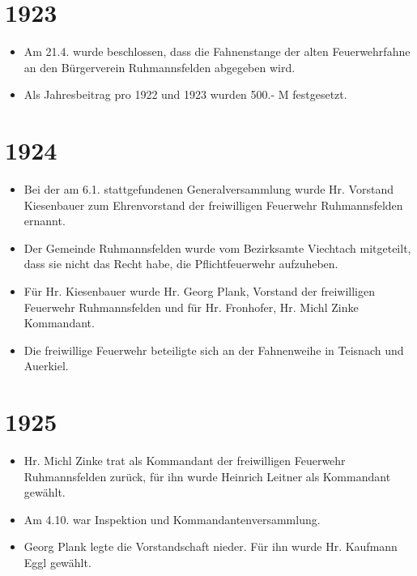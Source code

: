 \documentclass[12pt,a4paper]{book}
\begin{document}
\section*{1923}

\begin{itemize}
\item Am 21.4. wurde beschlossen, dass die Fahnenstange der alten Feuerwehrfahne
an den Bürgerverein Ruhmannsfelden abgegeben wird.

\item Als Jahresbeitrag pro 1922 und 1923 wurden 500.- M festgesetzt.
\end{itemize}

\section*{1924}

\begin{itemize}
\item Bei der am 6.1. stattgefundenen Generalversammlung wurde Hr. Vorstand
Kiesenbauer zum Ehrenvorstand der freiwilligen Feuerwehr Ruhmannsfelden ernannt.

\item Der Gemeinde Ruhmannsfelden wurde vom Bezirksamte Viechtach mitgeteilt,
dass sie nicht das Recht habe, die Pflichtfeuerwehr aufzuheben.

\item Für Hr. Kiesenbauer wurde Hr. Georg Plank, Vorstand der freiwilligen
Feuerwehr Ruhmannsfelden und für Hr. Fronhofer, Hr. Michl Zinke Kommandant.

\item Die freiwillige Feuerwehr beteiligte sich an der Fahnenweihe in Teisnach
und Auerkiel.
\end{itemize}

\section*{1925}

\begin{itemize}
\item Hr. Michl Zinke trat als Kommandant der freiwilligen Feuerwehr
Ruhmannsfelden zurück, für ihn wurde Heinrich Leitner als Kommandant gewählt.

\item Am 4.10. war Inspektion und Kommandantenversammlung.

\item Georg Plank legte die Vorstandschaft nieder. Für ihn wurde Hr. Kaufmann
Eggl gewählt.
\end{itemize}
\end{document}
